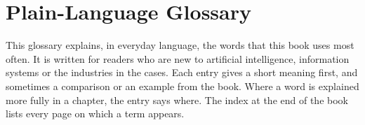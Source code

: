 
\chapter{Plain-Language Glossary}
\label{app:glossary}

This glossary explains, in everyday language, the words that this book uses most often. It is written for readers who are new to artificial intelligence, information systems or the industries in the cases. Each entry gives a short meaning first, and sometimes a comparison or an example from the book. Where a word is explained more fully in a chapter, the entry says where. The index at the end of the book lists every page on which a term appears.

